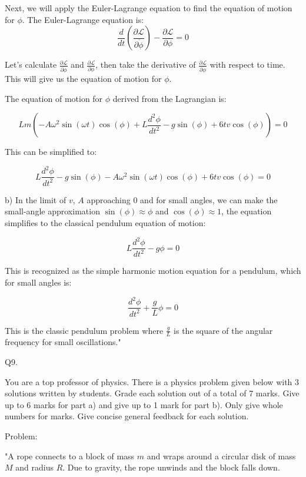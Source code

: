 Next, we will apply the Euler-Lagrange equation to find the equation of motion for \( \phi \). The Euler-Lagrange equation is:
\[ \frac{d}{dt} \left( \frac{\partial \mathcal{L}}{\partial \dot{\phi}} \right) - \frac{\partial \mathcal{L}}{\partial \phi} = 0 \]

Let's calculate \( \frac{\partial \mathcal{L}}{\partial \dot{\phi}} \) and \( \frac{\partial \mathcal{L}}{\partial \phi} \), then take the derivative of \( \frac{\partial \mathcal{L}}{\partial \dot{\phi}} \) with respect to time. This will give us the equation of motion for \( \phi \).

The equation of motion for \( \phi \) derived from the Lagrangian is:

\[ Lm \left( -A\omega^2 \sin(\omega t) \cos(\phi) + L \frac{d^2 \phi}{dt^2} - g \sin(\phi) + 6tv \cos(\phi) \right) = 0 \]

This can be simplified to:

\[ L \frac{d^2 \phi}{dt^2} - g \sin(\phi) - A\omega^2 \sin(\omega t) \cos(\phi) + 6tv \cos(\phi) = 0 \]

b) In the limit of \( v \), \( A \) approaching 0 and for small angles, we can make the small-angle approximation \( \sin(\phi) \approx \phi \) and \( \cos(\phi) \approx 1 \), the equation simplifies to the classical pendulum equation of motion:

\[ L\frac{d^2 \phi}{dt^2} - g \phi = 0 \]

This is recognized as the simple harmonic motion equation for a pendulum, which for small angles is:

\[ \frac{d^2 \phi}{dt^2} + \frac{g}{L} \phi = 0 \]

This is the classic pendulum problem where \( \frac{g}{L} \) is the square of the angular frequency for small oscillations."



                           Q9. 

You are a top professor of physics. There is a physics problem given below with 3 solutions written by students. Grade each solution out of a total of 7 marks. Give up to 6 marks for part a) and give up to 1 mark for part b). Only give whole numbers for marks. Give concise general feedback for each solution.

Problem:

"A rope connects to a block of mass \( m \) and wraps around a circular disk of mass \( M \) and radius \( R \). Due to gravity, the rope unwinds and the block falls down. 

